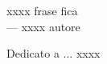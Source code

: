 
\cleardoublepage
{}
\thispagestyle{empty}

\vspace*{3cm}

\begin{center}
xxxx frase fica\\ \medskip
--- xxxx autore
\end{center}

\medskip

\begin{center}
Dedicato a ... xxxx
\end{center}
